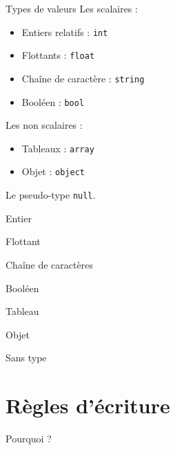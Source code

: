 \begin{frame}{Types de valeurs}
Les scalaires :
\begin{itemize}
\item Entiers relatifs : \texttt{int}
\item Flottants : \texttt{float}
\item Chaîne de caractère : \texttt{string}
\item Booléen : \texttt{bool}
\end{itemize}
Les non scalaires :
\begin{itemize}
\item Tableaux : \texttt{array}
\item Objet : \texttt{object}
\end{itemize}
Le pseudo-type \texttt{null}.
\end{frame}

\begin{frame}{Entier}

\end{frame}

\begin{frame}{Flottant}

\end{frame}

\begin{frame}{Chaîne de caractères}

\end{frame}

\begin{frame}{Booléen}

\end{frame}

\begin{frame}{Tableau}

\end{frame}

\begin{frame}{Objet}

\end{frame}

\begin{frame}{Sans type}

\end{frame}

\section{Règles d’écriture}

\begin{frame}{Pourquoi ?}

\end{frame}

